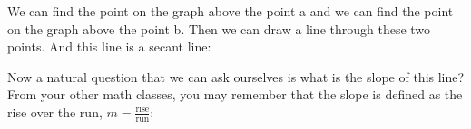 \documentclass[pdftex, brazil, 12pt, twoside]{article}
\begin{document}
\begin{figure}[H]
  \begin{center}
  \end{center}
\end{figure}

We can find the point on the graph above the point a
and we can find the point on the graph above the point b.
Then we can draw a line through these two points.
And this line is a secant line:

\begin{figure}[H]
  \begin{center}
  \end{center}
\end{figure}

Now a natural question that we can
ask ourselves is what is the slope of this line?
From your other math classes, you
may remember that the slope is defined
as the rise over the run, $m = \frac{\text{rise}}{\text{run}}$:
\end{document}

